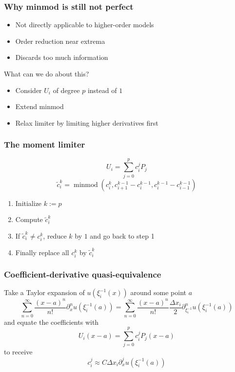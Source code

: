 \documentclass[11pt]{beamer}
\DeclareMathOperator{\minmod}{minmod}
\begin{document}
\begin{frame}
  \frametitle{Why minmod is still not perfect}
  \begin{itemize}
  \item Not directly applicable to higher-order models
  \item Order reduction near extrema
  \item Discards too much information
  \end{itemize}

  \vspace{2em}

  What can we do about this?
  \begin{itemize}
  \item Consider $U_{i}$ of degree $p$ instead of $1$
  \item Extend minmod
  \item Relax limiter by limiting higher derivatives first
  \end{itemize}
\end{frame}

\begin{frame}
  \frametitle{The moment limiter}
  \begin{equation*}
    U_{i} = \sum_{j = 0}^{p} c_{i}^{j} P_{j}
  \end{equation*}
  \begin{equation*}
    \tilde{c}_{i}^{k} = \minmod\left( c_{i}^{k}, c_{i + 1}^{k - 1} - c_{i}^{k - 1}, c_{i}^{k - 1} - c_{i - 1}^{k - 1} \right)
  \end{equation*}
  \begin{enumerate}
  \item Initialize $k := p$
  \item Compute $\tilde{c}_{i}^{k}$
  \item If $\tilde{c}_{i}^{k} \ne c_{i}^{k}$, reduce $k$ by $1$ and go back to step 1
  \item Finally replace all $c_{i}^{k}$ by $\tilde{c}_{i}^{k}$
  \end{enumerate}
\end{frame}

\begin{frame}
  \frametitle{Coefficient-derivative quasi-equivalence}
  Take a Taylor expansion of $u(\xi_{i}^{-1}(x))$ around some point $a$
  \begin{equation*}
    \sum_{n = 0}^{\infty} \frac{(x - a)^{n}}{n!} \partial_{x}^{n} u(\xi_{i}^{-1}(a)) = \sum_{n = 0}^{\infty} \frac{(x - a)^{n}}{n!} \frac{\Delta x_{i}}{2} \partial_{\xi_{i}^{-1}}^{n} u(\xi_{i}^{-1}(a))
  \end{equation*}
  and equate the coefficients with
  \begin{equation*}
    U_{i}(x - a) = \sum_{j = 0}^{p} c_{i}^{j} P_{j}(x - a)
  \end{equation*}
  to receive
  \begin{equation*}
    c_{i}^{j} \approx C \Delta x_{i} \partial_{x}^{j} u(\xi_{i}^{-1}(a))
  \end{equation*}
\end{frame}
\end{document}
